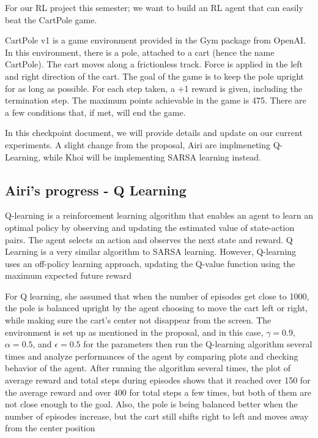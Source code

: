 \documentclass[nohyperref]{article}
\theoremstyle{plain}
\theoremstyle{definition}
\theoremstyle{remark}
\begin{document}

For our RL project this semester; we want to build an RL agent that can easily beat the CartPole game.  

CartPole v1 is a game environment provided in the Gym package from OpenAI. In this environment, there is a pole, attached to a cart (hence the name CartPole). The cart moves along a frictionless track. Force is applied in the left and right direction of the cart.
The goal of the game is to keep the pole upright for as long as possible. For each step taken, a +1 reward is given, including the termination step. The maximum points achievable in the game is 475. There are a few conditions that, if met, will end the game.

In this checkpoint document, we will provide details and update on our current experiments. A slight change from the proposal, Airi are implmeneting Q-Learning, while Khoi will be implementing SARSA learning instead.

\subsection*{Airi's progress - Q Learning}
Q-learning is a reinforcement learning algorithm that enables an agent to learn an optimal policy by observing and updating the estimated value of state-action pairs. 
The agent selects an action and observes the next state and reward.
Q Learning is a very similar algorithm to SARSA learning. However, Q-learning uses an off-policy learning approach, updating the Q-value function using the maximum expected future reward

For Q learning, she assumed that when the number of episodes get close to 1000, the pole is balanced upright by the agent choosing to move the cart left or right, while making sure the cart's center not disappear from the screen. 
The environment is set up as mentioned in the proposal, and in this case, $\gamma = 0.9$, $\alpha = 0.5$, and $\epsilon = 0.5$ for the parameters then run the Q-learning algorithm several times and analyze performances of the agent by comparing plots and checking behavior of the agent.  
After running the algorithm several times, the plot of average reward and total steps during episodes shows that it reached over 150 for the average reward and over 400 for total steps a few times, but both of them are not close enough to the goal.
Also, the pole is being balanced better when the number of episodes increase, but the cart still shifts right to left and moves away from the center position
\end{document}
